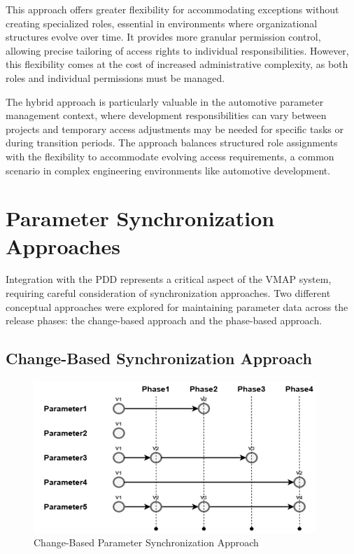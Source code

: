 This approach offers greater flexibility for accommodating exceptions without creating specialized roles, essential in environments where organizational structures evolve over time. It provides more granular permission control, allowing precise tailoring of access rights to individual responsibilities. However, this flexibility comes at the cost of increased administrative complexity, as both roles and individual permissions must be managed.

The hybrid approach is particularly valuable in the automotive parameter management context, where development responsibilities can vary between projects and temporary access adjustments may be needed for specific tasks or during transition periods. The approach balances structured role assignments with the flexibility to accommodate evolving access requirements, a common scenario in complex engineering environments like automotive development.

\section{Parameter Synchronization Approaches}
\label{sec:parameter-sync-approaches}

Integration with the \ac{PDD} represents a critical aspect of the \ac{VMAP} system, requiring careful consideration of synchronization approaches. Two different conceptual approaches were explored for maintaining parameter data across the release phases: the change-based approach and the phase-based approach.

\subsection{Change-Based Synchronization Approach}
\label{subsec:change-based-sync}

\begin{figure}[h]
    \centering
    \includegraphics[width=0.95\textwidth]{figures/change_based_approach.png}
    \caption{Change-Based Parameter Synchronization Approach}
    \label{fig:change-based-sync}
\end{figure}

